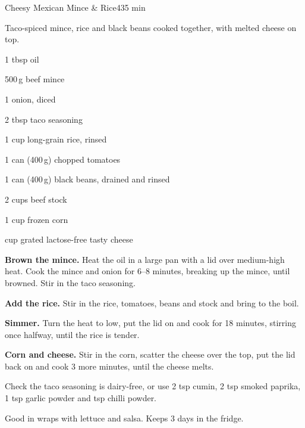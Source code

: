 \begin{recipebox}{Cheesy Mexican Mince \& Rice}{4}{35 min}

Taco-spiced mince, rice and black beans cooked together, with melted cheese on
top.

\begin{ingredients}
  \item 1 tbsp oil
  \item 500\,g beef mince
  \item 1 onion, diced
  \item 2 tbsp taco seasoning
  \item 1 cup long-grain rice, rinsed
  \item 1 can (400\,g) chopped tomatoes
  \item 1 can (400\,g) black beans, drained and rinsed
  \item 2 cups beef stock
  \item 1 cup frozen corn
  \item {} cup grated lactose-free tasty cheese
\end{ingredients}

\begin{method}
  \item \textbf{Brown the mince.} Heat the oil in a large pan with a lid over
        medium-high heat. Cook the mince and onion for 6--8 minutes, breaking up
        the mince, until browned. Stir in the taco seasoning.
  \item \textbf{Add the rice.} Stir in the rice, tomatoes, beans and stock and bring
        to the boil.
  \item \textbf{Simmer.} Turn the heat to low, put the lid on and cook for 18
        minutes, stirring once halfway, until the rice is tender.
  \item \textbf{Corn and cheese.} Stir in the corn, scatter the cheese over the top,
        put the lid back on and cook 3 more minutes, until the cheese melts.
\end{method}

\begin{notelist}
  \item Check the taco seasoning is dairy-free, or use 2 tsp cumin, 2 tsp smoked
        paprika, 1 tsp garlic powder and  tsp chilli powder.
  \item Good in wraps with lettuce and salsa. Keeps 3 days in the fridge.
\end{notelist}

\end{recipebox}
